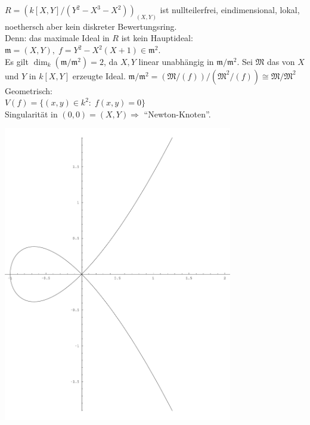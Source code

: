 \begin{nnBsp}
$R = (k[X,Y]/(Y^2-X^3-X^2))_{(X,Y)}$ ist nullteilerfrei, eindimensional, lokal, noethersch aber kein diskreter Bewertungsring.\\
Denn: das maximale Ideal in $R$ ist kein Hauptideal: $\mathfrak{m}=(X,Y), \; f = Y^2-X^2(X+1) \in \mathfrak{m}^2$.\\
Es gilt $\dim_k(\mathfrak{m}/\mathfrak{m}^2) = 2$, da $X,Y$ linear unabhängig in $\mathfrak{m}/\mathfrak{m}^2$.
Sei $\mathfrak{M}$ das von $X$ und $Y$ in $k[X,Y]$ erzeugte Ideal.
$\mathfrak{m}/\mathfrak{m}^2 = (\mathfrak{M}/(f))/(\mathfrak{M}^2/(f)) \cong \mathfrak{M}/\mathfrak{M}^2$\\
Geometrisch:\\
$V(f) = \{(x,y) \in k^2: \; f(x,y) = 0\}$\\
Singularität in $(0,0) = (X,Y) \Rightarrow$ ``Newton-Knoten''.
\begin{center}
	\includegraphics[width=0.75\textwidth]{images/algebra2/newtonknoten.pdf}
\end{center}
\end{nnBsp}
